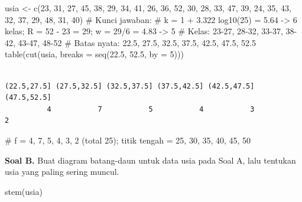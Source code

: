 \documentclass[
  indonesian,
  letterpaper,
]{book}
\newenvironment{Shaded}{\begin{snugshade}}{\end{snugshade}}
\newcommand{\AttributeTok}[1]{\textcolor[rgb]{0.40,0.45,0.13}{#1}}
\newcommand{\CommentTok}[1]{\textcolor[rgb]{0.37,0.37,0.37}{#1}}
\newcommand{\DecValTok}[1]{\textcolor[rgb]{0.68,0.00,0.00}{#1}}
\newcommand{\FloatTok}[1]{\textcolor[rgb]{0.68,0.00,0.00}{#1}}
\newcommand{\FunctionTok}[1]{\textcolor[rgb]{0.28,0.35,0.67}{#1}}
\newcommand{\NormalTok}[1]{\textcolor[rgb]{0.00,0.23,0.31}{#1}}
\newcommand{\OtherTok}[1]{\textcolor[rgb]{0.00,0.23,0.31}{#1}}
\begin{document}
\begin{Shaded}
\begin{Highlighting}[]
\NormalTok{usia }\OtherTok{\textless{}{-}} \FunctionTok{c}\NormalTok{(}\DecValTok{23}\NormalTok{, }\DecValTok{31}\NormalTok{, }\DecValTok{27}\NormalTok{, }\DecValTok{45}\NormalTok{, }\DecValTok{38}\NormalTok{, }\DecValTok{29}\NormalTok{, }\DecValTok{34}\NormalTok{, }\DecValTok{41}\NormalTok{, }\DecValTok{26}\NormalTok{, }\DecValTok{36}\NormalTok{, }\DecValTok{52}\NormalTok{, }\DecValTok{30}\NormalTok{, }\DecValTok{28}\NormalTok{, }\DecValTok{33}\NormalTok{, }\DecValTok{47}\NormalTok{, }\DecValTok{39}\NormalTok{, }\DecValTok{24}\NormalTok{, }\DecValTok{35}\NormalTok{, }\DecValTok{43}\NormalTok{,}
\DecValTok{32}\NormalTok{, }\DecValTok{37}\NormalTok{, }\DecValTok{29}\NormalTok{, }\DecValTok{48}\NormalTok{, }\DecValTok{31}\NormalTok{, }\DecValTok{40}\NormalTok{)}
\CommentTok{\# Kunci jawaban:}
\CommentTok{\# k = 1 + 3.322 log10(25) = 5.64 {-}\textgreater{} 6 kelas; R = 52 {-} 23 = 29; w = 29/6 = 4.83 {-}\textgreater{} 5}
\CommentTok{\# Kelas: 23{-}27, 28{-}32, 33{-}37, 38{-}42, 43{-}47, 48{-}52}
\CommentTok{\# Batas nyata: 22.5, 27.5, 32.5, 37.5, 42.5, 47.5, 52.5}
\FunctionTok{table}\NormalTok{(}\FunctionTok{cut}\NormalTok{(usia, }\AttributeTok{breaks =} \FunctionTok{seq}\NormalTok{(}\FloatTok{22.5}\NormalTok{, }\FloatTok{52.5}\NormalTok{, }\AttributeTok{by =} \DecValTok{5}\NormalTok{)))}
\end{Highlighting}
\end{Shaded}

\begin{verbatim}

(22.5,27.5] (27.5,32.5] (32.5,37.5] (37.5,42.5] (42.5,47.5] (47.5,52.5] 
          4           7           5           4           3           2 
\end{verbatim}

\begin{Shaded}
\begin{Highlighting}[]
\CommentTok{\# f = 4, 7, 5, 4, 3, 2 (total 25); titik tengah = 25, 30, 35, 40, 45, 50}
\end{Highlighting}
\end{Shaded}

\textbf{Soal B.} Buat diagram batang-daun untuk data usia pada Soal A,
lalu tentukan usia yang paling sering muncul.

\begin{Shaded}
\begin{Highlighting}[]
\FunctionTok{stem}\NormalTok{(usia)}
\end{Highlighting}
\end{Shaded}
\end{document}
